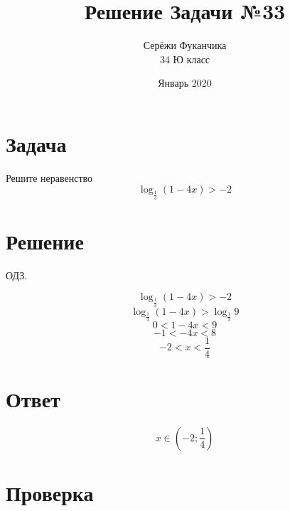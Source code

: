 \documentclass{article}
\title{Решение Задачи №33}
\author{Серёжи Фуканчика\\34 Ю класс}
\date{Январь 2020}
\begin{document}
\maketitle

\section{Задача}
Решите неравенство
$$
\log_{\frac{1}{3}}{(1-4x)}>-2
$$

\section{Решение}
ОДЗ.

$$\log_{\frac{1}{3}}{(1-4x)}>-2$$
$$\log_{\frac{1}{3}}{(1-4x)}>\log_{\frac{1}{3}}9$$
$$0<1-4x<9$$
$$-1<-4x<8$$
$$-2<x<\frac{1}{4}$$

\section{Ответ}
$$x\in{}\left(-2;\frac{1}{4}\right)$$

\section{Проверка}
\end{document}
